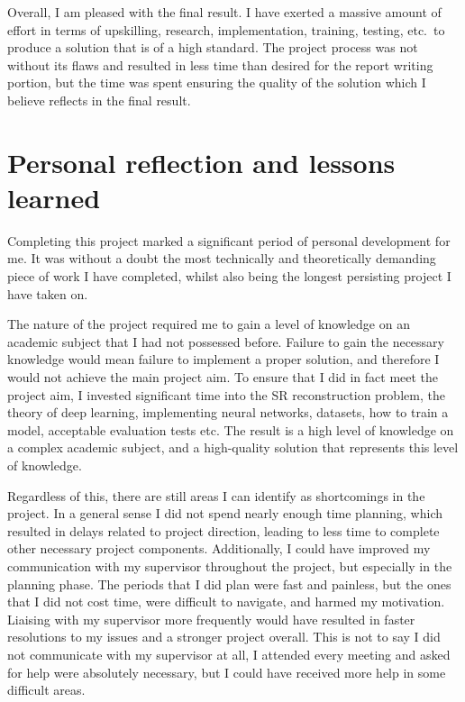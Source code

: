 \begin{appendices}
Overall, I am pleased with the final result. I have exerted a massive amount of effort in terms of upskilling, research, implementation, training, testing, etc.\ to produce a solution that is of a high standard. The project process was not without its flaws and resulted in less time than desired for the report writing portion, but the time was spent ensuring the quality of the solution which I believe reflects in the final result.

\section{Personal reflection and lessons learned}
Completing this project marked a significant period of personal development for me. It was without a doubt the most technically and theoretically demanding piece of work I have completed, whilst also being the longest persisting project I have taken on.

The nature of the project required me to gain a level of knowledge on an academic subject that I had not possessed before. Failure to gain the necessary knowledge would mean failure to implement a proper solution, and therefore I would not achieve the main project aim. To ensure that I did in fact meet the project aim, I invested significant time into the SR reconstruction problem, the theory of deep learning, implementing neural networks, datasets, how to train a model, acceptable evaluation tests etc. The result is a high level of knowledge on a complex academic subject, and a high-quality solution that represents this level of knowledge.

Regardless of this, there are still areas I can identify as shortcomings in the project. In a general sense I did not spend nearly enough time planning, which resulted in delays related to project direction, leading to less time to complete other necessary project components. Additionally, I could have improved my communication with my supervisor throughout the project, but especially in the planning phase. The periods that I did plan were fast and painless, but the ones that I did not cost time, were difficult to navigate, and harmed my motivation. Liaising with my supervisor more frequently would have resulted in faster resolutions to my issues and a stronger project overall. This is not to say I did not communicate with my supervisor at all, I attended every meeting and asked for help were absolutely necessary, but I could have received more help in some difficult areas.


\end{appendices}
